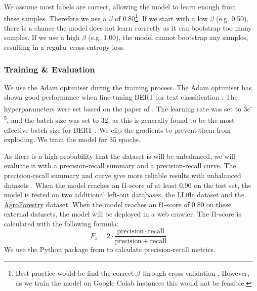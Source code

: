 \documentclass[a4paper, 12pt, oneside]{book} %
\begin{document}
We assume most labels are correct, allowing the model to learn enough from these samples.
Therefore we use a \(\beta\) of 0.80\footnote{Best practice would be find the correct \(\beta\) through cross validation \autocite{reed_training_2015, han_survey_2021}. However, as we train the model on Google Colab instances this would not be feasible.}.
If we start with a low \(\beta\) (e.g. 0.50), there is a chance the model does not learn correctly as it can bootstrap too many samples.
If we use a high \(\beta\) (e.g. 1,00), the model cannot bootstrap any samples, resulting in a regular cross-entropy loss.

\subsubsection{Training \& Evaluation}
We use the Adam optimiser \autocite{kingma_adam_2017} during the training process.
The Adam optimiser has shown good performance when fine-tuning BERT for text classification \autocite{you_large_2020}.
The hyperparameters were set based on the paper of \textcite{sun_how_2020}.
The learning rate was set to 3e\textsuperscript{-5}, and the batch size was set to 32, as this is generally found to be the most effective batch size for BERT \autocite{devlin_bert_2019, sanh_distilbert_2020, sun_how_2020, you_large_2020}.
We clip the gradients to prevent them from exploding. 
We train the model for 35 epochs.

As there is a high probability that the dataset is will be unbalanced, we will evaluate it with a precision-recall summary and a precision-recall curve.
The precision-recall summary and curve give more reliable results with unbalanced datasets \autocite{saito_precision-recall_2015}.
When the model reaches an f1-score of at least 0.90 on the test set, the model is tested on two additional left-out databases, the \href{http://www.llifle.com/}{LLifle} dataset and the \href{https://www.worldagroforestry.org/}{AgroForestry} dataset.
When the model reaches an f1-score of 0.80 on these external datasets, the model will be deployed in a web crawler.
The f1-score is calculated with the following formula:
\begin{equation}
    F_1 = 2 \cdot \frac{\mathrm{precision} \cdot \mathrm{recall}}{\mathrm{precision} + \mathrm{recall}} 
\end{equation}
We use the Python package from \textcite{pedregosa_scikit-learn_2011} to calculate precision-recall metrics.
\end{document}

